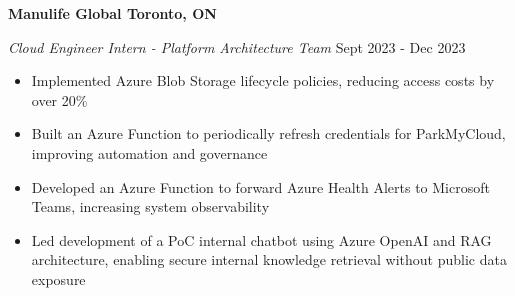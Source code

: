 \textbf{Manulife Global \hfill Toronto, ON}\par
\textit{Cloud Engineer Intern - Platform Architecture Team} \hfill Sept 2023 - Dec 2023

\begin{itemize}
  \item Implemented Azure Blob Storage lifecycle policies, reducing access costs by over 20\%
  \item Built an Azure Function to periodically refresh credentials for ParkMyCloud, improving automation and governance
  \item Developed an Azure Function to forward Azure Health Alerts to Microsoft Teams, increasing system observability
  \item Led development of a PoC internal chatbot using Azure OpenAI and RAG architecture, enabling secure internal knowledge retrieval without public data exposure
\end{itemize}
\vspace{0.2cm} \par
